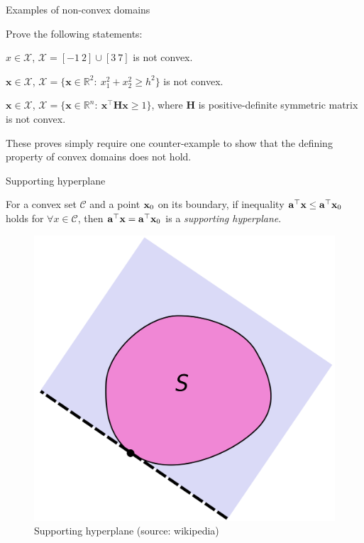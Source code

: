 \documentclass{beamer}
\begin{document}
\begin{frame}{Examples of non-convex domains}
	\begin{flushleft}
		
		Prove the following statements:
		
		$x \in \mathcal{X}$, $\mathcal{X} = [-1 \ 2] \cup [3 \ 7]$ is not convex.
		
		\bigskip
		
		$\mathbf{x} \in \mathcal{X}$, $\mathcal{X} = \{ \mathbf{x} \in \mathbb{R}^2: \ x_1^2+x_2^2 \geq h^2 \}$ is not convex. 
		
		\bigskip
		
		$\mathbf{x} \in \mathcal{X}$, $\mathcal{X} = \{ \mathbf{x} \in \mathbb{R}^n: \ \mathbf{x}^\top \mathbf{H} \mathbf{x} \geq 1 \}$, where $\mathbf{H}$ is positive-definite symmetric matrix is not convex. 
		
		\bigskip
		
		These proves simply require one counter-example to show that the defining property of convex domains does not hold.
		
	\end{flushleft}
\end{frame}



\begin{frame}{Supporting hyperplane}
	\begin{flushleft}
		
		For a convex set $\mathcal C$ and a point $\mathbf{x}_0$ on its boundary, if inequality $\mathbf{a}^\top \mathbf{x} \leq \mathbf{a}^\top \mathbf{x}_0$ holds for $\forall x \in \mathcal C$, then $\mathbf{a}^\top \mathbf{x} = \mathbf{a}^\top \mathbf{x}_0$ is a \emph{supporting hyperplane}.
		
		\begin{figure}
			\centering
			\includegraphics[width=0.5\linewidth]{Supporting_hyperplane}
			\caption{Supporting hyperplane (source: wikipedia)}
			\label{fig:supportinghyperplane}
		\end{figure}
		
		
	\end{flushleft}
\end{frame}
\end{document}
